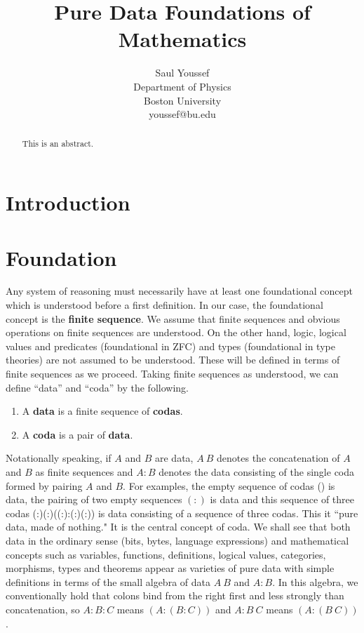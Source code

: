 \documentclass[11pt]{article}
\begin{document}
\title{Pure Data Foundations of Mathematics}
\author{%
  Saul Youssef%
  \hfil \\
  Department of Physics \\
  Boston University \\
  youssef@bu.edu\\
}
\maketitle
\begin{abstract}
This is an abstract.
\end{abstract}

\section{Introduction}
\section{Foundation} 

     Any system of reasoning must necessarily have at least one foundational concept which is understood before a first definition.  In our case, the foundational concept is the {\bf finite sequence}.  We assume that finite sequences and obvious operations on finite sequences are understood.  On the other hand, logic, logical values and predicates (foundational in ZFC) and types (foundational in type theories) are not assumed to be understood.  These will be defined in terms of finite sequences as we proceed.   
Taking finite sequences as understood, we can define ``data'' and ``coda'' by the following. 
\begin{enumerate}
\item[] A {\bf data} is a finite sequence of {\bf codas}.
\item[] A {\bf coda} is a pair of {\bf data}.
\end{enumerate}
Notationally speaking, if $A$ and $B$ are data, $A\ B$ denotes the concatenation of $A$ and $B$ as finite sequences and $A:B$ denotes the data 
consisting of the single coda formed by pairing $A$ and $B$.  For examples, the empty sequence of codas () is data, the pairing 
of two empty sequences $(:)$ is data and this sequence of three 
codas  (:)(:)((:):(:)(:)) is data consisting of a sequence of three codas.  This it ``pure data, made of nothing."  It is the central concept of coda.  
We shall see that both data in the ordinary sense (bits, bytes, language expressions) and mathematical concepts such as variables, functions, definitions, logical values, categories, morphisms, types and theorems appear as varieties of pure data with simple definitions in terms of the small algebra of data $A\ B$ and $A:B$.   In this algebra, we conventionally hold that colons bind from the right first and less strongly than concatenation, so $A:B:C$ means $(A:(B:C))$ and $A:B\ C$ means $(A:(B\ C))$.
\end{document}
